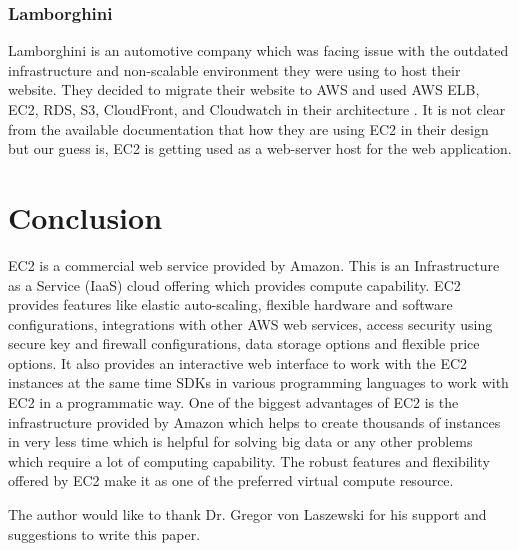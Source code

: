 \subsubsection{Lamborghini}
Lamborghini is an automotive company which was facing issue with the outdated infrastructure and non-scalable environment they were using to host their website. They decided to migrate their website to AWS and used AWS ELB, EC2, RDS, S3, CloudFront, and Cloudwatch in their architecture \cite{hid-sp18-402-www-aws-ec2-lamborghini}. It is not clear from the available documentation that how they are using EC2 in their design but our guess is, EC2 is getting used as a web-server host for the web application.

\section{Conclusion}
EC2 is a commercial web service provided by Amazon. This is an Infrastructure as a Service (IaaS) cloud offering which provides compute capability. EC2 provides features like elastic auto-scaling, flexible hardware and software configurations, integrations with other AWS web services, access security using secure key and firewall configurations, data storage options and flexible price options. It also provides an interactive web interface to work with the EC2 instances at the same time SDKs in various programming languages to work with EC2 in a programmatic way. One of the biggest advantages of EC2 is the infrastructure provided by Amazon which helps to create thousands of instances in very less time which is helpful for solving big data or any other problems which require a lot of computing capability. The robust features and flexibility offered by EC2 make it as one of the preferred virtual compute resource.

\begin{acks}

  The author would like to thank Dr. Gregor von Laszewski for his
  support and suggestions to write this paper.

\end{acks}


 
